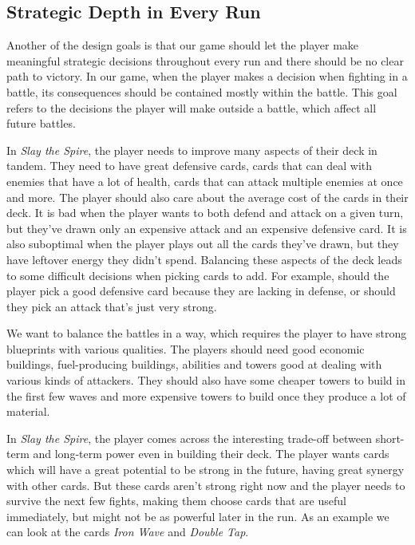 \subsection{Strategic Depth in Every Run} \label{sec:goal-depth-run}

Another of the design goals is that our game should let the player make meaningful strategic decisions throughout every run and there should be no clear path to victory.
In our game, when the player makes a decision when fighting in a battle, its consequences should be contained mostly within the battle.
This goal refers to the decisions the player will make outside a battle, which affect all future battles.

In \emph{Slay the Spire}, the player needs to improve many aspects of their deck in tandem.
They need to have great defensive cards, cards that can deal with enemies that have a lot of health, cards that can attack multiple enemies at once and more.
The player should also care about the average cost of the cards in their deck.
It is bad when the player wants to both defend and attack on a given turn, but they've drawn only an expensive attack and an expensive defensive card.
It is also suboptimal when the player plays out all the cards they've drawn, but they have leftover energy they didn't spend.
Balancing these aspects of the deck leads to some difficult decisions when picking cards to add.
For example, should the player pick a good defensive card because they are lacking in defense, or should they pick an attack that's just very strong.

We want to balance the battles in a way, which requires the player to have strong blueprints with various qualities.
The players should need good economic buildings, fuel-producing buildings, abilities and towers good at dealing with various kinds of attackers.
They should also have some cheaper towers to build in the first few waves and more expensive towers to build once they produce a lot of material.

In \emph{Slay the Spire}, the player comes across the interesting trade-off between short-term and long-term power even in building their deck.
The player wants cards which will have a great potential to be strong in the future, having great synergy with other cards.
But these cards aren't strong right now and the player needs to survive the next few fights, making them choose cards that are useful immediately, but might not be as powerful later in the run.
As an example we can look at the cards \emph{Iron Wave} and \emph{Double Tap}.

